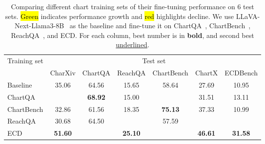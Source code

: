 \begin{table}[t]
\centering
\scriptsize
\setlength{\tabcolsep}{1.0mm}
{
\begin{tabular}{l|cccccc}
\toprule
\multicolumn{1}{c|}{\multirow{2}{*}{Training set}} & \multicolumn{6}{c}{{Test set}}                                                                                 \\ \cline{2-7}
\multicolumn{1}{l|}{}                       & {CharXiv}                 & {ChartQA}               & {ReachQA}               & {ChartBench}             & {ChartX}  & {ECDBench}  \\ \hline
\rowcolor{gray!10}Baseline           & 35.06                   & 64.56                 & 15.65                & 58.64                  & 27.69  & 10.95             \\ \hline
ChartQA                       & \cellcolor{green!8}{\ul 35.16}           & \cellcolor{green!8}\textbf{68.92} & \cellcolor{red!8}15.00          & \cellcolor{green!8}{61.41}           & \cellcolor{green!8}31.51  & \cellcolor{green!8}13.11        \\
ChartBench                     & \cellcolor{red!8}32.86           & \cellcolor{red!8}61.56         & \cellcolor{green!8}18.35          & \cellcolor{green!8}\textbf{75.13} & \cellcolor{green!8}37.33  & \cellcolor{green!8}10.99         \\
ReachQA                      & \cellcolor{red!8}30.68           & \cellcolor{red!8}64.50         & \cellcolor{green!8}{\ul 24.35}          & \cellcolor{red!8}57.59           & \cellcolor{green!8}{\ul 39.24} & \cellcolor{green!8}{\ul 13.48}          \\
ECD                          & \cellcolor{green!8}\textbf{51.60} & \cellcolor{green!8}{\ul 68.64}   & \cellcolor{green!8}\textbf{25.10} & \cellcolor{green!8}{\ul 62.30}     & \cellcolor{green!8}\textbf{46.61} & \cellcolor{green!8}\textbf{31.58} \\ \bottomrule
\end{tabular}
}
\vspace{-1mm}
\caption{
Comparing different chart training sets of their fine-tuning performance on 6 test sets.
\hl{{Green}} indicates performance growth and 
\hl{{red}} highlights decline. We use LLaVA-Next-Llama3-8B~\cite{li2024llavanext} as the baseline and fine-tune it on ChartQA~\cite{masry2022chartqa}, ChartBench~\cite{xu2023chartbench}, ReachQA~\cite{he2024distill}, and ECD. For each column, best number is in \textbf{bold}, and second best \underline{underlined}.
}
\label{tab:training comparison}
\vspace{-5mm}
\end{table}

